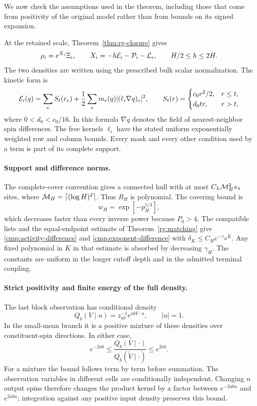 We now check the assumptions used in the theorem, including those that
come from positivity of the original model rather than from bounds on
its signed expansion.

At the retained scale, Theorem~\ref{thm:rg-closure} gives
\begin{equation}
 \rho_i=e^{X_i}\Xi_i,\qquad
 X_i=-h{\cal E}_i-{\cal P}_i-{\cal L}_i,\qquad
 H/2\le h\le2H.
 \label{cmp:RG-density}
\end{equation}
The two densities are written using the prescribed bulk scalar
normalization.  The kinetic form is
\begin{equation}
 {\cal E}_i(q)=\sum_e S_t(r_e)
           +\frac12\sum_e m_e(q)|(\ell_i\nabla q)_e|^2,
 \qquad
 S_t(r)=
 \begin{cases}
       c_0r^2/2,&r\le t,\\
       d_0tr,&r>t,
 \end{cases}
 \label{cmp:kinetic-form}
\end{equation}
where \(0<d_0<c_0/16\).  In this formula \(\nabla q\) denotes the field of
nearest-neighbor spin differences.  The free kernels \(\ell_i\) have
the stated uniform exponentially weighted row and column bounds.
Every mask and every other condition used by a term is part of its
complete support.

\paragraph{Support and difference norms.}
The complete-cover convention gives a connected hull with at most
\(C_L{\cal M}_H^2s_\lambda\) sites, where
\({\cal M}_H=\lceil(\log H)^2\rceil\).  Thus \(R_H\) is polynomial.
The covering bound is
\[
 w_H=\exp[-p_H^{1/4}],
\]
which decreases faster than every inverse power because \(P_0>4\).
The compatible lists and the equal-endpoint estimate of
Theorem~\ref{rg:matching} give
\eqref{cmp:activity-difference} and \eqref{cmp:exponent-difference}
with \(\delta_K\le C_He^{-\gamma_HK}\).  Any fixed polynomial in \(K\)
in that estimate is absorbed by decreasing \(\gamma_H\).
The constants are uniform in the longer cutoff depth and in the
admitted terminal coupling.

\paragraph{Strict positivity and finite energy of the full density.}
The last block observation has conditional density
\[
 Q_b(V\mid u)=z_{ab}^{-1}e^{abV\cdot u},\qquad |u|=1.
\]
In the small-mean branch it is a positive mixture of these densities
over constituent-spin directions.  In either case,
\begin{equation}
 e^{-2ab}\le\frac{Q_b(V\mid\cdot)}{Q_b(\widetilde V\mid\cdot)}
                     \le e^{2ab}.
 \label{cmp:kernel-ratio}
\end{equation}
For a mixture the bound follows term by term before summation.
The observation variables in different cells are conditionally
independent.  Changing \(n\) output spins therefore changes the product
kernel by a factor between \(e^{-2abn}\) and \(e^{2abn}\); integration
against any positive input density preserves this bound.

